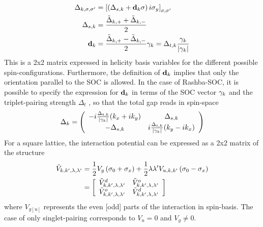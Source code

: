 \begin{align}\label{eq:gap_tri_spinbasis}
    \Delta_{k, \sigma, \sigma'} &= \left[ \left(\Delta_{s,k} + \vb{d}_k\vb{\sigma}\right)i\sigma_y\right]_{\sigma, \sigma'} \\ \nonumber
    \Delta_{s,k} &= \frac{\Tilde{\Delta}_{k,+} + \Tilde{\Delta}_{k,-} }{2} \\ \nonumber
    \vb{d}_k &= \frac{\Tilde{\Delta}_{k,+} - \Tilde{\Delta}_{k,-} }{2} \vb{\gamma}_k = \Delta_{t,k} \frac{\vb{\gamma}_k}{|\vb{\gamma}_k|}
\end{align}
This is a 2x2 matrix expressed in helicity basis variables for the different possible spin-configurations.
Furthermore, the definition of $\vb{d}_k$ implies that only the orientation parallel to the SOC is allowed. 
\newline
In the case of Rashba-SOC, it is possible to specify the expression for $\vb{d}_k$ in terms of the SOC vector $\vb{\gamma}_k$ and the triplet-pairing strength $\Delta_t$ \cite{Ikegaya_2021_tunableMajorana}, so that the total gap reads in spin-space
\begin{align}\label{eq:gap_singlet+triplet}
    \Delta_k = \left(
    \begin{array}{cc}
        -i\frac{\Delta_{t,k}}{|\vb{\gamma}_k|}(k_x + i k_y) &  \Delta_{s,k} \\
        -\Delta_{s,k} & i\frac{\Delta_{t,k}}{|\vb{\gamma}_k|}(k_y - ik_x) 
    \end{array}
    \right)
\end{align}
For a square lattice, the interaction potential can be expressed as a 2x2 matrix of the structure \cite{samokhin2008gap}
\begin{align} \label{eq:couling_tri}
    \Tilde{V}_{k,k', \lambda, \lambda'} &= \frac{1}{2} V_g \left( \sigma_0 + \sigma_x \right) + \frac{1}{2} \lambda \lambda' V_{u,k,k'} \left( \sigma_0 - \sigma_x\right) \\ \nonumber
    &= \left[
    \begin{array}{cc}
       \Tilde{V}^d_{k,k', \lambda, \lambda'}  & \Tilde{V}^o_{k,k', \lambda, \lambda'}  \\
         \Tilde{V}^o_{k,k', \lambda, \lambda'} & \Tilde{V}^d_{k,k', \lambda, \lambda'}
    \end{array}
    \right]
\end{align}
where $V_{g[u]}$ represents the even [odd] parts of the interaction in spin-basis. 
The case of only singlet-pairing corresponds to $V_u = 0$ and $V_g \neq 0$. 

